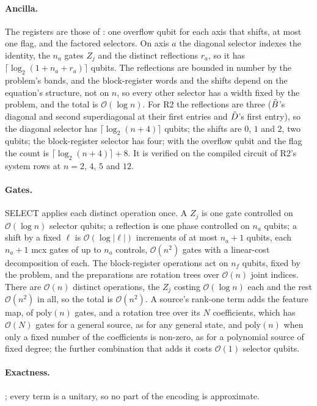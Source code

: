 \paragraph{Ancilla.} The registers are those of : one overflow qubit for each axis that shifts, at most one flag, and the factored selectors. On axis $a$ the diagonal selector indexes the identity, the $n_a$ gates $Z_j$ and the distinct reflections $r_a$, so it has $\lceil\log_2(1+n_a+r_a)\rceil$ qubits. The reflections are bounded in number by the problem's bands, and the block-register words and the shifts depend on the equation's structure, not on $n$, so every other selector has a width fixed by the problem, and the total is $\mathcal{O}(\log n)$. For R2 the reflections are three ($\tilde{B}$'s diagonal and second superdiagonal at their first entries and $\tilde{D}$'s first entry), so the diagonal selector has $\lceil\log_2(n+4)\rceil$ qubits; the shifts are $0$, $1$ and $2$, two qubits; the block-register selector has four; with the overflow qubit and the flag the count is $\lceil\log_2(n+4)\rceil+8$. It is verified on the compiled circuit of R2's system rows at $n=2$, $4$, $5$ and $12$.

\paragraph{Gates.} SELECT applies each distinct operation once. A $Z_j$ is one gate controlled on $\mathcal{O}(\log n)$ selector qubits; a reflection is one phase controlled on $n_a$ qubits; a shift by a fixed $\ell$ is $\mathcal{O}(\log|\ell|)$ increments of at most $n_a+1$ qubits, each $n_a+1$ \gls{mcx} gates of up to $n_a$ controls, $\mathcal{O}(n^2)$ gates with a linear-cost decomposition of each. The block-register operations act on $n_f$ qubits, fixed by the problem, and the preparations are rotation trees over $\mathcal{O}(n)$ joint indices. There are $\mathcal{O}(n)$ distinct operations, the $Z_j$ costing $\mathcal{O}(\log n)$ each and the rest $\mathcal{O}(n^2)$ in all, so the total is $\mathcal{O}(n^2)$. A source's rank-one term adds the feature map, of $\mathrm{poly}(n)$ gates, and a rotation tree over its $N$ coefficients, which has $\mathcal{O}(N)$ gates for a general source, as for any general state, and $\mathrm{poly}(n)$ when only a fixed number of the coefficients is non-zero, as for a polynomial source of fixed degree; the further combination that adds it costs $\mathcal{O}(1)$ selector qubits.

\paragraph{Exactness.} ; every term is a unitary, so no part of the encoding is approximate.


